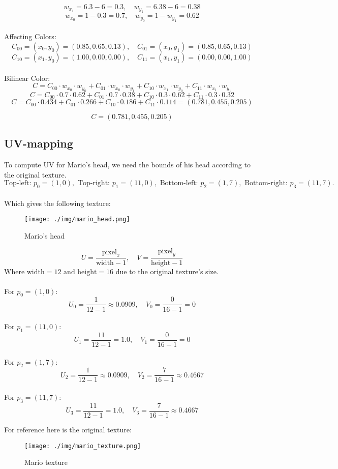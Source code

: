 \documentclass{article}
\begin{document}
$$
w_{x_1} = 6.3 - 6 = 0.3, \quad w_{y_1} = 6.38 - 6 = 0.38
$$
$$
w_{x_0} = 1 - 0.3 = 0.7, \quad w_{y_0} = 1 - w_{y_1} = 0.62
$$
\\
Affecting Colors:
$$
C_{00} = (x_0, y_0) = (0.85, 0.65, 0.13), \quad C_{01} = (x_0, y_1) = (0.85, 0.65, 0.13)
$$
$$
C_{10} = (x_1, y_0) = (1.00, 0.00, 0.00), \quad C_{11} = (x_1, y_1) = (0.00, 0.00, 1.00)
$$
\\
Bilinear Color:
$$
C = C_{00} \cdot w_{x_0} \cdot w_{y_0} + C_{01} \cdot w_{x_0} \cdot w_{y_1} + C_{10} \cdot w_{x_1} \cdot w_{y_0} + C_{11} \cdot w_{x_1} \cdot w_{y_1}
$$
$$
C = C_{00} \cdot 0.7 \cdot 0.62 + C_{01} \cdot 0.7 \cdot 0.38 + C_{10} \cdot 0.3 \cdot 0.62 + C_{11} \cdot 0.3 \cdot 0.32
$$
$$
C = C_{00} \cdot 0.434 + C_{01} \cdot 0.266 + C_{10} \cdot 0.186 + C_{11} \cdot 0.114 = (0.781, 0.455, 0.205)
$$

$$
C = (0.781, 0.455, 0.205)
$$


\newpage
\subsection{UV-mapping}

To compute UV for Mario's head, we need the bounds of his head according to the original texture. 
\\
$$
\text{Top-left: } p_0 = (1, 0), \text{ Top-right: } p_1 =(11, 0), \text{ Bottom-left: } p_2 = (1, 7),\text{ Bottom-right: } p_3 = (11, 7).
$$
\\
Which gives the following texture:

\begin{figure}[H]
    \centering
    \texttt{[image: ./img/mario\_head.png]}
    \caption{Mario's head}
    \label{fig:mario-head}
\end{figure}

$$
U = \frac{\text{pixel}_x}{\text{width} -1}, \quad V = \frac{\text{pixel}_y}{\text{height} - 1}
$$
Where $\text{width} = 12 \text{ and height} = 16$ due to the original texture's size.
\\
\\
For $p_0 = (1, 0)$:
$$
U_0 = \frac{1}{\text{12} -1} \approx 0.0909, \quad V_0 = \frac{0}{16 - 1} = 0
$$
\\
For $p_1 = (11, 0)$:
$$
U_1 = \frac{11}{\text{12} -1} = 1.0, \quad V_1 = \frac{0}{16 - 1} = 0
$$
\\
For $p_2 = (1, 7)$:
$$
U_2 = \frac{1}{\text{12} -1} \approx 0.0909, \quad V_2 = \frac{7}{16 - 1} \approx 0.4667
$$
\\
For $p_3 = (11, 7)$:
$$
U_3 = \frac{11}{\text{12} -1} = 1.0, \quad V_3 = \frac{7}{16 - 1} \approx 0.4667
$$

\newpage
For reference here is the original texture:

\begin{figure}[H]
    \centering
    \texttt{[image: ./img/mario\_texture.png]}
    \caption{Mario texture}
    \label{fig:mario}
\end{figure}
\end{document}
